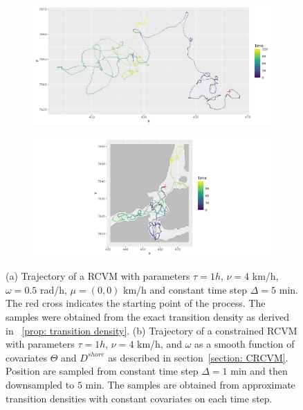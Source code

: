 \documentclass[11pt]{article}
\newcommand {\1}{\mathbb{1}}
\theoremstyle{definition}
\theoremstyle{remark}
\theoremstyle{remark}
\begin{document}
\begin{figure}[H]
	\centering
	\begin{subfigure}{0.48\textwidth}
		\centering
		\includegraphics[scale=0.3]{images/rcvm/illustrative_sample_standard.png}
		\caption{}
	\end{subfigure}
	\begin{subfigure}{0.48\textwidth}
		\centering
		\includegraphics[scale=0.3]{images/crcvm/illustrative_sample_fjords_standard.png}
		\caption{}
	\end{subfigure}
	\caption{(a) Trajectory of a RCVM with parameters $\tau=1 h$, $\nu=4$ km/h,$\omega=0.5$ rad/h, $\mu=(0,0)$ km/h and constant time step $\Delta=5$ min. The red cross indicates the starting point of the process. The samples were obtained from the exact transition density as derived in ~\ref{prop: transition density}. (b) Trajectory of a constrained RCVM with parameters $\tau=1 h$, $\nu=4$ km/h, and $\omega$ as a smooth function of covariates $\Theta$ and $D^{shore}$ as described in section~\ref{section: CRCVM}. Position are sampled from constant time step $\Delta= 1$ min and then downsampled to $5$ min. The samples are obtained from approximate transition densities  with constant covariates on each time step.}
	\label{fig: sample RACVM}
\end{figure}
\end{document}
